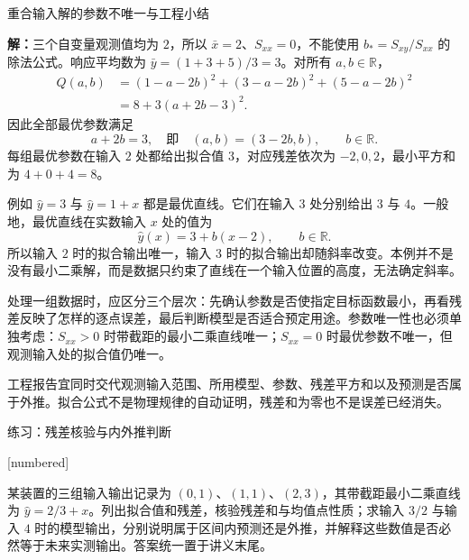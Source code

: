 \documentclass[aspectratio=169,10pt,fontset=fandol]{ctexbeamer}
\makeatletter
\newcommand{\mathagentexerciselabelcontext}[1]{%
\hypertarget<1>{#1}{}%
\edef\@currentHref{#1}%
}
\makeatother
\begin{document}
\begin{frame}[t,fragile]{重合输入解的参数不唯一与工程小结}
\footnotesize
{\footnotesize
\par\noindent\textbf{解：}三个自变量观测值均为 $2$，所以 $\bar{x}=2$、$S_{xx}=0$，不能使用 $b_*=S_{xy}/S_{xx}$ 的除法公式。响应平均数为 $\bar{y}=(1+3+5)/3=3$。对所有 $a,b\in\mathbb{R}$，
\[
\begin{aligned}
Q(a,b)&=(1-a-2b)^2+(3-a-2b)^2+(5-a-2b)^2\\
&=8+3(a+2b-3)^2.
\end{aligned}
\]
因此全部最优参数满足
\[
a+2b=3,
\quad\text{即}\quad (a,b)=(3-2b,b),\qquad b\in\mathbb{R}.
\]
每组最优参数在输入 $2$ 处都给出拟合值 $3$，对应残差依次为 $-2,0,2$，最小平方和为 $4+0+4=8$。


}
{\footnotesize
例如 $\hat{y}=3$ 与 $\hat{y}=1+x$ 都是最优直线。它们在输入 $3$ 处分别给出 $3$ 与 $4$。一般地，最优直线在实数输入 $x$ 处的值为
\[
\hat{y}(x)=3+b(x-2),\qquad b\in\mathbb{R}.
\]
所以输入 $2$ 时的拟合输出唯一，输入 $3$ 时的拟合输出却随斜率改变。本例并不是没有最小二乘解，而是数据只约束了直线在一个输入位置的高度，无法确定斜率。\par

}
{\footnotesize
处理一组数据时，应区分三个层次：先确认参数是否使指定目标函数最小，再看残差反映了怎样的逐点误差，最后判断模型是否适合预定用途。参数唯一性也必须单独考虑：$S_{xx}>0$ 时带截距的最小二乘直线唯一；$S_{xx}=0$ 时最优参数不唯一，但观测输入处的拟合值仍唯一。


}
{\footnotesize
工程报告宜同时交代观测输入范围、所用模型、参数、残差平方和以及预测是否属于外推。拟合公式不是物理规律的自动证明，残差和为零也不是误差已经消失。\par

}
\end{frame}
\begin{frame}[t,fragile]{练习：残差核验与内外推判断}
\normalsize
{\normalsize
[numbered]
\mathagentexerciselabelcontext{mathagent.exercise.U0050.0}
\begin{exercise}
\label{mathagent:exercise:792316d6ae426af3441a87022eb342411ffcb273e3da7957f4be83fb59518d0a}
某装置的三组输入输出记录为 $(0,1)$、$(1,1)$、$(2,3)$，其带截距最小二乘直线为 $\hat{y}=2/3+x$。列出拟合值和残差，核验残差和与均值点性质；求输入 $3/2$ 与输入 $4$ 时的模型输出，分别说明属于区间内预测还是外推，并解释这些数值是否必然等于未来实测输出。答案统一置于讲义末尾。
\end{exercise}
}
\end{frame}
\end{document}

